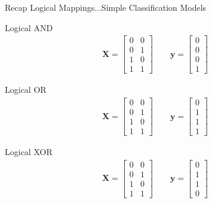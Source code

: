 \documentclass[mathserif, aspectratio=1610]{intbeamer}
\begin{document}
\begin{frame}[t]{Recap Logical Mappings...Simple Classification Models}

Logical AND
\begin{align*}
\bm{X} =
\begin{bmatrix}
0 & 0\\
0 & 1\\
1 & 0\\
1 & 1
\end{bmatrix}\qquad
\bm{y} =
\begin{bmatrix}
0\\
0\\
0\\
1
\end{bmatrix}
\end{align*}


Logical OR
\begin{align*}
\bm{X} =
\begin{bmatrix}
0 & 0\\
0 & 1\\
1 & 0\\
1 & 1
\end{bmatrix}\qquad
\bm{y} =
\begin{bmatrix}
0\\
1\\
1\\
1
\end{bmatrix}
\end{align*}


Logical XOR
\begin{align*}
\bm{X} =
\begin{bmatrix}
0 & 0\\
0 & 1\\
1 & 0\\
1 & 1
\end{bmatrix}\qquad
\bm{y} =
\begin{bmatrix}
0\\
1\\
1\\
0
\end{bmatrix}
\end{align*}

\end{frame}
\end{document}
